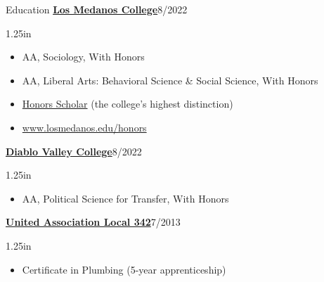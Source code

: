 \documentclass[12pt]{resume} %
\newcommand{\righthandindent}{1.25in}
\begin{document}
\begin{rSection}{Education}
    \textbf{\href{https://www.losmedanos.edu/}{Los Medanos College}}\hfill{}8/2022 
\begin{adjustwidth}{0pt}{\righthandindent}
\vspace{-7pt}
\begin{itemize}
    \item[] AA, Sociology, With Honors
    \vspace{-7pt}
    \item[] AA, Liberal Arts: Behavioral Science \& Social Science, With Honors
    \vspace{-7pt}
    \item[] \href{https://www.losmedanos.edu/honors/prog.aspx\#:~:text=Honors\%20Scholar\%20Requirements}{Honors Scholar} (the college’s highest distinction)
    \vspace{-7pt}
    \item[] \hspace*{20pt}\href{https://www.losmedanos.edu/honors/prog.aspx\#:~:text=Honors\%20Scholar\%20Requirements}{www.losmedanos.edu/honors}
\end{itemize}

\end{adjustwidth}

    \textbf{\href{https://www.dvc.edu/}{Diablo Valley College}}\hfill{}8/2022
\begin{adjustwidth}{0pt}{\righthandindent}
    \vspace{-7pt}
    \begin{itemize}
        \item[] AA, Political Science for Transfer, With Honors
    \end{itemize}
\end{adjustwidth}

    \href{https://ua342.org/training}{\textbf{United Association Local 342}}\hfill{}7/2013
\begin{adjustwidth}{0pt}{\righthandindent}
    \vspace{-7pt}
    \begin{itemize}
        \item[] Certificate in Plumbing (5-year apprenticeship)
    \end{itemize}
\end{adjustwidth}

\end{rSection}
\end{document}
